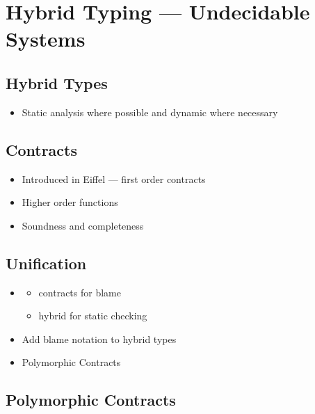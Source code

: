\section{Hybrid Typing --- Undecidable Systems}

\subsection{Hybrid Types}
\begin{itemize}
\item Static analysis where possible and dynamic where necessary \cite{flanagan06}
\end{itemize}

\subsection{Contracts}
\begin{itemize}
\item  Introduced in Eiffel --- first order contracts
\item  Higher order functions \cite{Findler02}
\item  Soundness and completeness \cite{BlumeM06}
\end{itemize}

\subsection{Unification}
\begin{itemize}
\item
\cite{Gronski07}
\begin{itemize}
\item contracts for blame
\item hybrid for static checking
\end{itemize}
\item Add blame notation to hybrid types \cite{WadlerF09}
\item Polymorphic Contracts \cite{Greenberg11, Greenberg12} 
\end{itemize}



\subsection{Polymorphic Contracts}

